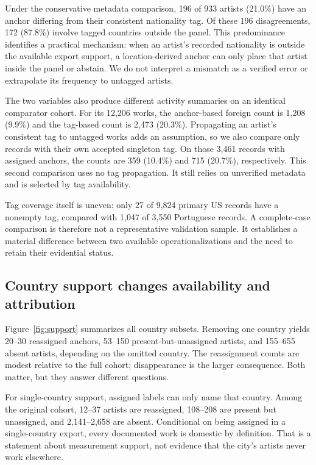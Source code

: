 Under the conservative metadata comparison, 196 of 933 artists (21.0\%) have an anchor differing from their consistent nationality tag. Of these 196 disagreements, 172 (87.8\%) involve tagged countries outside the panel. This predominance identifies a practical mechanism: when an artist's recorded nationality is outside the available export support, a location-derived anchor can only place that artist inside the panel or abstain. We do not interpret a mismatch as a verified error or extrapolate its frequency to untagged artists.

The two variables also produce different activity summaries on an identical comparator cohort. For its 12,206 works, the anchor-based foreign count is 1,208 (9.9\%) and the tag-based count is 2,473 (20.3\%). Propagating an artist's consistent tag to untagged works adds an assumption, so we also compare only records with their own accepted singleton tag. On those 3,461 records with assigned anchors, the counts are 359 (10.4\%) and 715 (20.7\%), respectively. This second comparison uses no tag propagation. It still relies on unverified metadata and is selected by tag availability.

Tag coverage itself is uneven: only 27 of 9,824 primary US records have a nonempty tag, compared with 1,047 of 3,550 Portuguese records. A complete-case comparison is therefore not a representative validation sample. It establishes a material difference between two available operationalizations and the need to retain their evidential status.

\subsection{Country support changes availability and attribution}
Figure~\ref{fig:support} summarizes all country subsets. Removing one country yields 20--30 reassigned anchors, 53--150 present-but-unassigned artists, and 155--655 absent artists, depending on the omitted country. The reassignment counts are modest relative to the full cohort; disappearance is the larger consequence. Both matter, but they answer different questions.

For single-country support, assigned labels can only name that country. Among the original cohort, 12--37 artists are reassigned, 108--208 are present but unassigned, and 2,141--2,658 are absent. Conditional on being assigned in a single-country export, every documented work is domestic by definition. That is a statement about measurement support, not evidence that the city's artists never work elsewhere.

